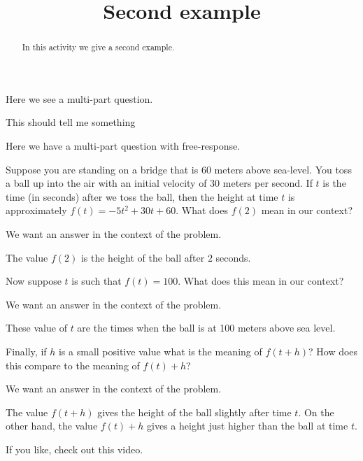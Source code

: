 \documentclass[handout,instructornotes]{ximera}
\title{Second example}
\begin{document}
\begin{abstract}
In this activity we give a second example.
\end{abstract} 
\maketitle
\begin{instructorNotes}
  Here we see a multi-part question.
\end{instructorNotes}

\begin{instructorIntro}
  This should tell me something
\end{instructorIntro}

Here we have a multi-part question with free-response.

\begin{question} 
Suppose you are standing on a bridge that is 60 meters above
sea-level. You toss a ball up into the air with an initial velocity of
30 meters per second.  If $t$ is the time (in seconds) after we toss
the ball, then the height at time $t$ is approximately $f(t) = -5 t^2
+30t+60$. What does $f(2)$ mean in our context?
\begin{hint}
We want an answer in the context of the problem. 
\end{hint}
\begin{freeResponse}
The value $f(2)$ is the height of the ball after $2$ seconds.
\end{freeResponse}
Now suppose $t$ is such that $f(t) = 100$. What does this mean in our
context?
\begin{hint}
We want an answer in the context of the problem. 
\end{hint}
\begin{freeResponse}
These value of $t$ are the times when the ball is at 100 meters above sea level.\end{freeResponse}
Finally, if $h$ is a small positive value what is the meaning of
$f(t+h)$? How does this compare to the meaning of $f(t)+h$?
\begin{hint}
We want an answer in the context of the problem. 
\end{hint}
\begin{freeResponse}
The value $f(t+h)$ gives the height of the ball slightly after time
$t$. On the other hand, the value $f(t)+h$ gives a height just higher
than the ball at time $t$.
\end{freeResponse}
\end{question}

If you like, check out this video.
\end{document}
